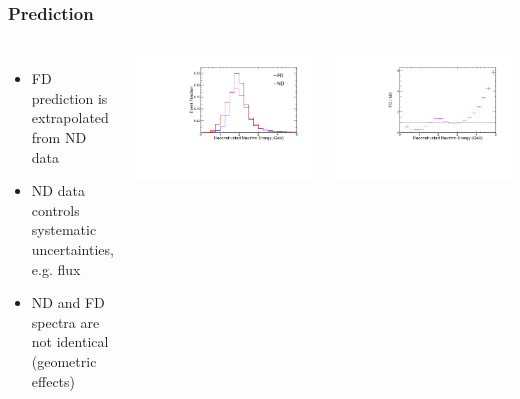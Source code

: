 \documentclass[10pt,professionalfonts,xcolor=table]{beamer}
\begin{document}
\begin{frame}
\frametitle{Prediction}
\begin{columns}[c]
\begin{itemize}
\item FD prediction is extrapolated from ND data
\gap
\item ND data controls systematic uncertainties, e.g. flux
\gap
\item ND and FD spectra are not identical (geometric effects)
\end{itemize}
\includegraphics[angle=-90, width=1\textwidth]{figures/plots/extrap/fd_nd_spec.pdf}


\includegraphics[angle=-90, width=1\textwidth]{figures/plots/extrap/fd_nd_ratio.pdf}

\end{columns}

\end{frame}
\end{document}
